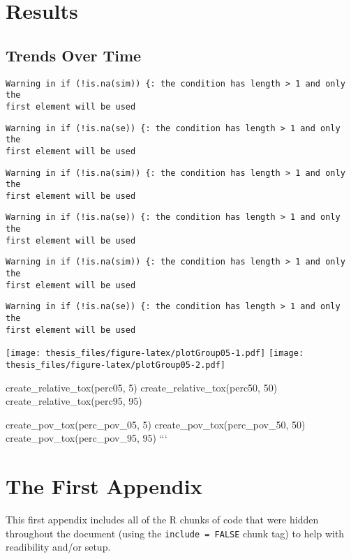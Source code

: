 \documentclass[12pt,twoside]{dukestatscithesis}
\theoremstyle{definition}
\theoremstyle{definition}
\theoremstyle{definition}
\theoremstyle{remark}
\begin{document}
\chapter{Results}\label{organization}

\section{Trends Over Time}\label{trends-over-time}
\begin{verbatim}
Warning in if (!is.na(sim)) {: the condition has length > 1 and only the
first element will be used
\end{verbatim}
\begin{verbatim}
Warning in if (!is.na(se)) {: the condition has length > 1 and only the
first element will be used
\end{verbatim}
\begin{verbatim}
Warning in if (!is.na(sim)) {: the condition has length > 1 and only the
first element will be used
\end{verbatim}
\begin{verbatim}
Warning in if (!is.na(se)) {: the condition has length > 1 and only the
first element will be used
\end{verbatim}
\begin{verbatim}
Warning in if (!is.na(sim)) {: the condition has length > 1 and only the
first element will be used
\end{verbatim}
\begin{verbatim}
Warning in if (!is.na(se)) {: the condition has length > 1 and only the
first element will be used
\end{verbatim}
\texttt{[image: thesis\_files/figure-latex/plotGroup05-1.pdf]}
\texttt{[image: thesis\_files/figure-latex/plotGroup05-2.pdf]}

create\_relative\_tox(perc05, 5) create\_relative\_tox(perc50, 50)
create\_relative\_tox(perc95, 95)

create\_pov\_tox(perc\_pov\_05, 5) create\_pov\_tox(perc\_pov\_50, 50)
create\_pov\_tox(perc\_pov\_95, 95) ```

\appendix

\chapter{The First Appendix}\label{the-first-appendix}

This first appendix includes all of the R chunks of code that were
hidden throughout the document (using the \texttt{include\ =\ FALSE}
chunk tag) to help with readibility and/or setup.
\end{document}
